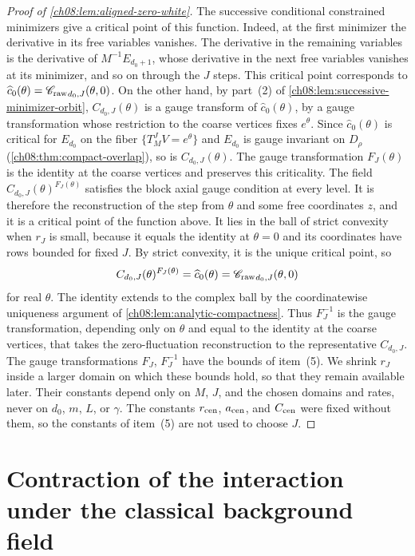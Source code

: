 \begin{proof}[Proof of \cref{ch08:lem:aligned-zero-white}]
The successive conditional constrained minimizers give a critical point of this function. Indeed, at the first minimizer the derivative in its free variables vanishes. The derivative in the remaining variables is the derivative of $M^{-1}E_{d_0+1}$, whose derivative in the next free variables vanishes at its minimizer, and so on through the $J$ steps. This critical point corresponds to $\widehat c_0(\theta)={\mathscr C_{\mathrm{raw}}}_{d_0,J}(\theta,0)$. On the other hand, by part~(2) of \cref{ch08:lem:successive-minimizer-orbit}, $C_{d_0,J}(\theta)$ is a gauge transform of $\widehat c_0(\theta)$, by a gauge transformation whose restriction to the coarse vertices fixes $e^\theta$. Since $\widehat c_0(\theta)$ is critical for $E_{d_0}$ on the fiber $\{T_M^JV=e^\theta\}$ and $E_{d_0}$ is gauge invariant on $D_\rho$ (\cref{ch08:thm:compact-overlap}), so is $C_{d_0,J}(\theta)$. The gauge transformation $F_J(\theta)$ is the identity at the coarse vertices and preserves this criticality. The field $C_{d_0,J}(\theta)^{F_J(\theta)}$ satisfies the block axial gauge condition at every level. It is therefore the reconstruction of the step from $\theta$ and some free coordinates $z$, and it is a critical point of the function above. It lies in the ball of strict convexity when $r_J$ is small, because it equals the identity at $\theta=0$ and its coordinates have rows bounded for fixed $J$. By strict convexity, it is the unique critical point, so
\[
 C_{d_0,J}(\theta)^{F_J(\theta)}=\widehat c_0(\theta)={\mathscr C_{\mathrm{raw}}}_{d_0,J}(\theta,0)
\]
for real $\theta$. The identity extends to the complex ball by the coordinatewise uniqueness argument of \cref{ch08:lem:analytic-compactness}. Thus $F_J^{-1}$ is the gauge transformation, depending only on $\theta$ and equal to the identity at the coarse vertices, that takes the zero-fluctuation reconstruction to the representative $C_{d_0,J}$. The gauge transformations $F_J$, $F_J^{-1}$ have the bounds of item~(5). We shrink $r_J$ inside a larger domain on which these bounds hold, so that they remain available later. Their constants depend only on $M$, $J$, and the chosen domains and rates, never on $d_0$, $m$, $L$, or $\gamma$. The constants $r_{\rm cen}$, $a_{\rm cen}$, and $C_{\rm cen}$ were fixed without them, so the constants of item~(5) are not used to choose $J$.
\end{proof}

\section{Contraction of the interaction under the classical background field}\label{ch08:sec:contraction}

